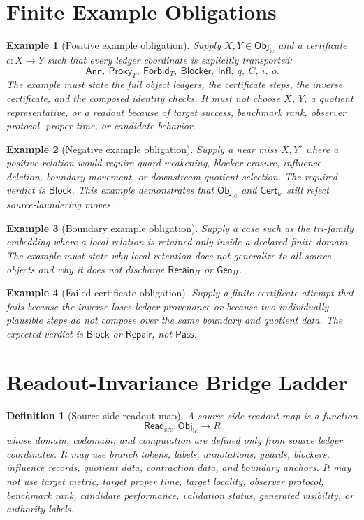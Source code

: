 \documentclass[11pt]{article}
\newcommand{\ObjLC}{\mathsf{Obj}_{\mathrm{lc}}}
\newcommand{\CertLC}{\mathsf{Cert}_{\mathrm{lc}}}
\newcommand{\ReadSrc}{\mathsf{Read}_{\mathrm{src}}}
\newcommand{\Ann}{\mathsf{Ann}}
\newcommand{\Proxy}{\mathsf{Proxy}_{T}}
\newcommand{\Forbid}{\mathsf{Forbid}_{T}}
\newcommand{\Blocker}{\mathsf{Blocker}}
\newcommand{\Infl}{\mathsf{Infl}}
\newcommand{\RetainH}{\mathsf{Retain}_{H}}
\newcommand{\GenH}{\mathsf{Gen}_{H}}
\newcommand{\Pass}{\mathsf{Pass}}
\newcommand{\Block}{\mathsf{Block}}
\newcommand{\Repair}{\mathsf{Repair}}
\newtheorem{definition}{Definition}
\newtheorem{examplecase}{Example}
\begin{document}
\section{Finite Example Obligations}

\begin{examplecase}[Positive example obligation]
Supply \(X,Y\in\ObjLC\) and a certificate \(c:X\to Y\) such that every
ledger coordinate is explicitly transported:
\[
    \Ann,\ \Proxy,\ \Forbid,\ \Blocker,\ \Infl,\ q,\ C,\ i,\ o.
\]
The example must state the full object ledgers, the certificate steps,
the inverse certificate, and the composed identity checks. It must not
choose \(X\), \(Y\), a quotient representative, or a readout because of
target success, benchmark rank, observer protocol, proper time, or
candidate behavior.
\end{examplecase}

\begin{examplecase}[Negative example obligation]
Supply a near miss \(X,Y'\) where a positive relation would require
guard weakening, blocker erasure, influence deletion, boundary movement,
or downstream quotient selection. The required verdict is \(\Block\).
This example demonstrates that \(\ObjLC\) and \(\CertLC\) still reject
source-laundering moves.
\end{examplecase}

\begin{examplecase}[Boundary example obligation]
Supply a case such as the tri-family embedding where a local relation is
retained only inside a declared finite domain. The example must state
why local retention does not generalize to all source objects and why it
does not discharge \(\RetainH\) or \(\GenH\).
\end{examplecase}

\begin{examplecase}[Failed-certificate obligation]
Supply a finite certificate attempt that fails because the inverse loses
ledger provenance or because two individually plausible steps do not
compose over the same boundary and quotient data. The expected verdict
is \(\Block\) or \(\Repair\), not \(\Pass\).
\end{examplecase}

\section{Readout-Invariance Bridge Ladder}

\begin{definition}[Source-side readout map]
A source-side readout map is a function
\[
    \ReadSrc:\ObjLC\to R
\]
whose domain, codomain, and computation are defined only from source
ledger coordinates. It may use branch tokens, labels, annotations,
guards, blockers, influence records, quotient data, contraction data,
and boundary anchors. It may not use target metric, target proper time,
target locality, observer protocol, benchmark rank, candidate
performance, validation status, generated visibility, or authority
labels.
\end{definition}
\end{document}

